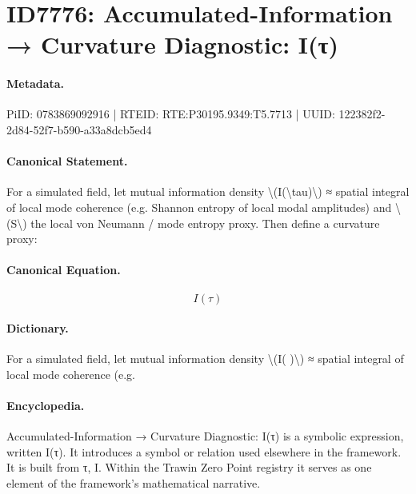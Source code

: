 \section*{ID7776: Accumulated-Information → Curvature Diagnostic: I(τ)}
\paragraph{Metadata.}
PiID: 0783869092916 | RTEID: RTE:P30195.9349:T5.7713 | UUID: 122382f2-2d84-52f7-b590-a33a8dcb5ed4

\paragraph{Canonical Statement.}
For a simulated field, let mutual information density \textbackslash{}(I(\textbackslash{}tau)\textbackslash{}) ≈ spatial integral of local mode coherence (e.g. Shannon entropy of local modal amplitudes) and \textbackslash{}(S\textbackslash{}) the local von Neumann / mode entropy proxy. Then define a curvature proxy:

\paragraph{Canonical Equation.}
\[
I(\tau)
\]

\paragraph{Dictionary.}
For a simulated field, let mutual information density \textbackslash{}(I( )\textbackslash{}) ≈ spatial integral of local mode coherence (e.g.

\paragraph{Encyclopedia.}
Accumulated-Information → Curvature Diagnostic: I(τ) is a symbolic expression, written I(τ). It introduces a symbol or relation used elsewhere in the framework. It is built from τ, I. Within the Trawin Zero Point registry it serves as one element of the framework's mathematical narrative.
